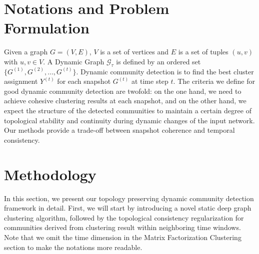\documentclass[letterpaper]{article} %
\begin{document}
\section{Notations and Problem Formulation}

Given a graph $G=(V, E)$, $V$ is a set of vertices and $E$ is a set of tuples $\left(u, v\right)$ with $u, v \in V$. A Dynamic Graph $\mathcal{G}_\tau$ is defined by an ordered set $\{ G^{(1)}, G^{(2)}, \ldots, G^{(t)}\}$. Dynamic community detection is to find the best cluster assignment $Y^{(t)}$ for each snapshot $G^{(t)}$ at time step $t$.
The criteria we define for good dynamic community detection are twofold: on the one hand, we need to achieve cohesive clustering results at each snapshot, and on the other hand, we expect the structure of the detected communities to maintain a certain degree of topological stability and continuity during dynamic changes of the input network. Our methods provide a trade-off between snapshot coherence and temporal consistency.

\section{Methodology}


In this section, we present our topology preserving dynamic community detection framework in detail. First, we will  start by introducing a novel static deep graph clustering algorithm, followed by the topological consistency regularization for communities derived from clustering result within neighboring time windows. Note that we omit the time dimension in the Matrix Factorization Clustering section to make the notations more readable.
\end{document}

